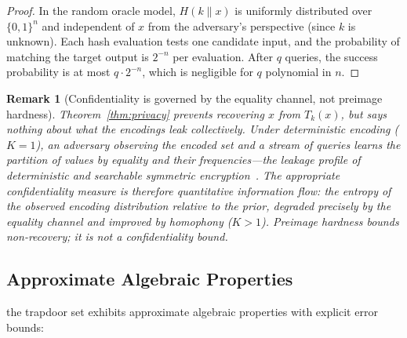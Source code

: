 \documentclass[10pt,conference]{IEEEtran}
\newtheorem{remark}[theorem]{Remark}
\begin{document}
\begin{proof}
In the random oracle model, $H(k \| x)$ is uniformly distributed over $\{0,1\}^n$ and independent of $x$ from the adversary's perspective (since $k$ is unknown). Each hash evaluation tests one candidate input, and the probability of matching the target output is $2^{-n}$ per evaluation. After $q$ queries, the success probability is at most $q \cdot 2^{-n}$, which is negligible for $q$ polynomial in $n$.
\end{proof}

\begin{remark}[Confidentiality is governed by the equality channel, not preimage hardness]
\label{rem:qif}
Theorem~\ref{thm:privacy} prevents recovering $x$ from $T_k(x)$, but says nothing about what the encodings leak \emph{collectively}. Under deterministic encoding ($K = 1$), an adversary observing the encoded set and a stream of queries learns the partition of values by equality and their frequencies---the leakage profile of deterministic and searchable symmetric encryption~\cite{curtmola2006searchable}. The appropriate confidentiality measure is therefore quantitative information flow: the entropy of the observed encoding distribution relative to the prior, degraded precisely by the equality channel and improved by homophony ($K > 1$). Preimage hardness bounds non-recovery; it is not a confidentiality bound.
\end{remark}

\subsection{Approximate Algebraic Properties}

the trapdoor set exhibits approximate algebraic properties with explicit error bounds:
\end{document}

